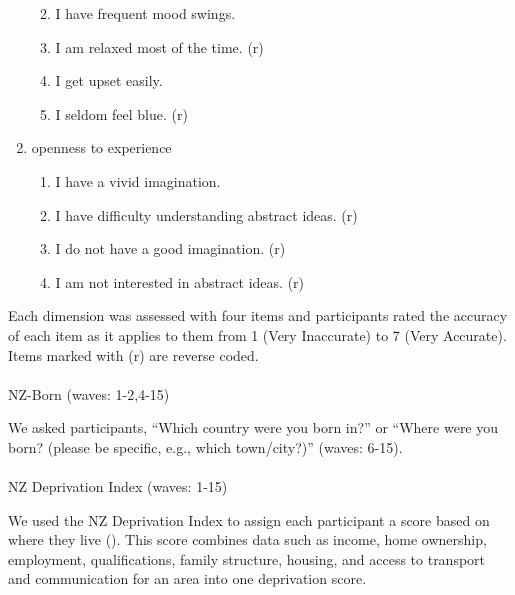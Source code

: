 \documentclass[
  singlecolumn]{article}
\makeatletter
\let\oldparagraph\paragraph
\renewcommand{\paragraph}{
    \@ifstar
      \xxxParagraphStar
      \xxxParagraphNoStar
  }
\newcommand{\xxxParagraphStar}[1]{\oldparagraph*{#1}\mbox{}}
\newcommand{\xxxParagraphNoStar}[1]{\oldparagraph{#1}\mbox{}}
\providecommand{\tightlist}{%
  \setlength{\itemsep}{0pt}\setlength{\parskip}{0pt}}\usepackage{longtable,booktabs,array}
\makeatother
\begin{document}
\begin{enumerate}
  \begin{enumerate}
  \def\labelenumii{\roman{enumii}.}
  \tightlist
  \item
    I have frequent mood swings.
  \item
    I am relaxed most of the time. (r)
  \item
    I get upset easily.
  \item
    I seldom feel blue. (r)
  \end{enumerate}
\item
  openness to experience

  \begin{enumerate}
  \def\labelenumii{\roman{enumii}.}
  \tightlist
  \item
    I have a vivid imagination.
  \item
    I have difficulty understanding abstract ideas. (r)
  \item
    I do not have a good imagination. (r)
  \item
    I am not interested in abstract ideas. (r)
  \end{enumerate}
\end{enumerate}

Each dimension was assessed with four items and participants rated the
accuracy of each item as it applies to them from 1 (Very Inaccurate) to
7 (Very Accurate). Items marked with (r) are reverse coded.

\paragraph{NZ-Born (waves: 1-2,4-15)}\label{nz-born-waves-1-24-15}

We asked participants, ``Which country were you born in?'' or ``Where
were you born? (please be specific, e.g., which town/city?)'' (waves:
6-15).

\paragraph{NZ Deprivation Index (waves:
1-15)}\label{nz-deprivation-index-waves-1-15}

We used the NZ Deprivation Index to assign each participant a score
based on where they live (). This score combines data such as income, home ownership,
employment, qualifications, family structure, housing, and access to
transport and communication for an area into one deprivation score.
\end{document}
